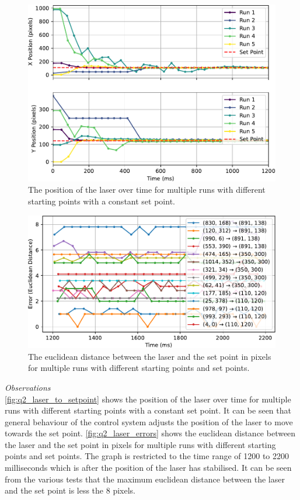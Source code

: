 \begin{figure}[h]
  \centering
  \includegraphics[width=\textwidth]{figures/results/q2.pdf}
  \caption{The position of the laser over time for multiple runs with different starting points with a constant set point.}
  \label{fig:q2_laser_to_setpoint}
\end{figure}

\begin{figure}[h]
  \centering
  \includegraphics[width=\textwidth]{figures/results/q2_errors.pdf}
  \caption{The euclidean distance between the laser and the set point in pixels for multiple runs with different starting points and set points.}
  \label{fig:q2_laser_errors}
\end{figure}

\textit{Observations}\\
\autoref{fig:q2_laser_to_setpoint} shows the position of the laser over time for multiple runs with different starting points with a constant set point. It can be seen that general behaviour of the control system adjusts the position of the laser to move towards the set point. \autoref{fig:q2_laser_errors} shows the euclidean distance between the laser and the set point in pixels for multiple runs with different starting points and set points. The graph is restricted to the time range of 1200 to 2200 milliseconds which is after the position of the laser has stabilised. It can be seen from the various tests that the maximum euclidean distance between the laser and the set point is less the 8 pixels.

